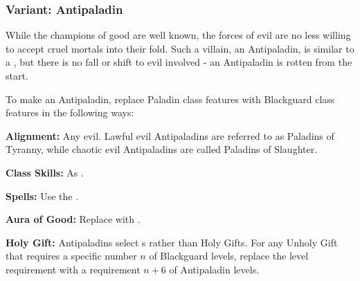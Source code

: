 \subsubsection[Antipaladin]{Variant: Antipaladin}
While the champions of good are well known, the forces of evil are no less willing to accept cruel mortals into their fold. Such a villain, an Antipaladin, is similar to a , but there is no fall or shift to evil involved - an Antipaladin is rotten from the start. 

To make an Antipaladin, replace Paladin class features with Blackguard class features in the following ways:

\begin{list}{}{\leftmargin=1em}
  \item \textbf{Alignment:} Any evil. Lawful evil Antipaladins are referred to as Paladins of Tyranny, while chaotic evil Antipaladins are called Paladins of Slaughter.
  \item \textbf{Class Skills:} As .
  \item \textbf{Spells:} Use the .
  \item \textbf{Aura of Good:} Replace with .
  \item \textbf{Holy Gift:} Antipaladins select s rather than Holy Gifts. For any Unholy Gift that requires a specific number $n$ of Blackguard levels, replace the level requirement with a requirement $n+6$ of Antipaladin levels.
\end{list}


